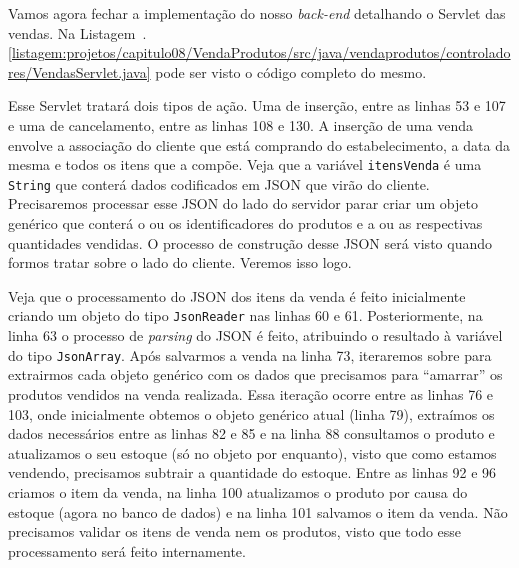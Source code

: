 Vamos agora fechar a implementação do nosso \textit{back-end} detalhando o Servlet das vendas. Na Listagem~\thechapter.\ref{listagem:projetos/capitulo08/VendaProdutos/src/java/vendaprodutos/controladores/VendasServlet.java} pode ser visto o código completo do mesmo.


Esse Servlet tratará dois tipos de ação. Uma de inserção, entre as linhas 53 e 107 e uma de cancelamento, entre as linhas 108 e 130. A inserção de uma venda envolve a associação do cliente que está comprando do estabelecimento, a data da mesma e todos os itens que a compõe. Veja que a variável \texttt{itensVenda} é uma \texttt{String} que conterá dados codificados em JSON que virão do cliente. Precisaremos processar esse JSON do lado do servidor parar criar um objeto genérico que conterá o ou os identificadores do produtos e a ou as respectivas quantidades vendidas. O processo de construção desse JSON será visto quando formos tratar sobre o lado do cliente. Veremos isso logo.

Veja que o processamento do JSON dos itens da venda é feito inicialmente criando um objeto do tipo \texttt{JsonReader} nas linhas 60 e 61. Posteriormente, na linha 63 o processo de \textit{parsing} do JSON é feito, atribuindo o resultado à variável  do tipo \texttt{JsonArray}. Após salvarmos a venda na linha 73, iteraremos sobre  para extrairmos cada objeto genérico com os dados que precisamos para ``amarrar'' os produtos vendidos na venda realizada. Essa iteração ocorre entre as linhas 76 e 103, onde inicialmente obtemos o objeto genérico atual (linha 79), extraímos os dados necessários entre as linhas 82 e 85 e na linha 88 consultamos o produto e atualizamos o seu estoque (só no objeto por enquanto), visto que como estamos vendendo, precisamos subtrair a quantidade do estoque. Entre as linhas 92 e 96 criamos o item da venda, na linha 100 atualizamos o produto por causa do estoque (agora no banco de dados) e na linha 101 salvamos o item da venda. Não precisamos validar os itens de venda nem os produtos, visto que todo esse processamento será feito internamente.

